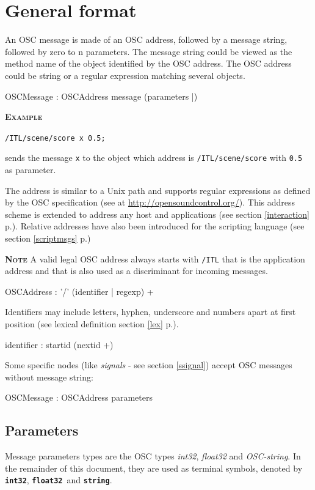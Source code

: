 \documentclass[a4paper,twoside]{report}
\newcommand{\toplevel}[1]	{\chapter{#1}}
\newcommand{\sublevel}[1]	{\section{#1}}
\newcommand{\fullref}[1]	{\ref{#1} p.\pageref{#1}}
\newcommand{\OSC}[1]		{\texttt{#1}}
\newcommand{\example}		{\textbf{\hspace{-1.5cm}\textbf{\textsc{Example }}}}
\newcommand{\note}	[1]		{\vspace{2mm}\textbf{\hspace{-1.03cm}\textbf{\textsc{Note #1}}}}
\newcommand{\osctype}[1]	{\textbf{\texttt{{\small #1}}}}
\newcommand{\oscint}		{\osctype{int32}}
\newcommand{\oscfloat}		{\osctype{float32}}
\newcommand{\oscstring}		{\osctype{string}}
\newcommand{\sample}	[1]			{\vspace{-2mm}\begin{center}\colorbox{mygrey}{
								\begin{minipage}[t]{0.9\columnwidth} 
								{\small \texttt{#1}}
								\end{minipage}}\end{center}}
\begin{document}
\newpage

\setcounter{page}{1}

\toplevel{General format}
\label{genformat}
An OSC message is made of an OSC address, followed by a message string, followed by zero to n parameters. The message string could be viewed as the method name of the object identified by the OSC address.
The OSC address could be string or a regular expression matching several objects.
\begin{rail}
OSCMessage : OSCAddress message (parameters |)
\end{rail}
\example
\sample{/ITL/scene/score x 0.5;}
sends the message \OSC{x} to the object which address is \OSC{/ITL/scene/score} with \OSC{0.5} as parameter.

The address is similar to a Unix path and supports regular expressions as defined by the OSC specification (see at \url{http://opensoundcontrol.org/}). This address scheme is extended to address any host and applications (see section \fullref{interaction}). Relative addresses have also been introduced for the scripting language (see section \fullref{scriptmsgs})

\note{} A valid legal OSC address always starts with \OSC{/ITL} that is the application address and that is also used as a discriminant for incoming messages.
\begin{rail}
OSCAddress : '/' (identifier | regexp) +
\end{rail}

Identifiers may include letters, hyphen, underscore and numbers apart at first position (see lexical definition section \fullref{lex}).
\railalias{nextid}{[-\_a-zA-Z0-9]]}
\begin{rail}
identifier : startid (nextid +)
\end{rail}

Some specific nodes (like \emph{signals} - see section \ref{ssignal}) accept OSC messages without message string:
\begin{rail}
OSCMessage : OSCAddress parameters
\end{rail}

\sublevel{Parameters}

Message parameters types are the OSC types \emph{int32}, \emph{float32} and \emph{OSC-string}. In the remainder of this document, they are used as terminal symbols, denoted by \oscint, \oscfloat\ and \oscstring. 
\end{document}
